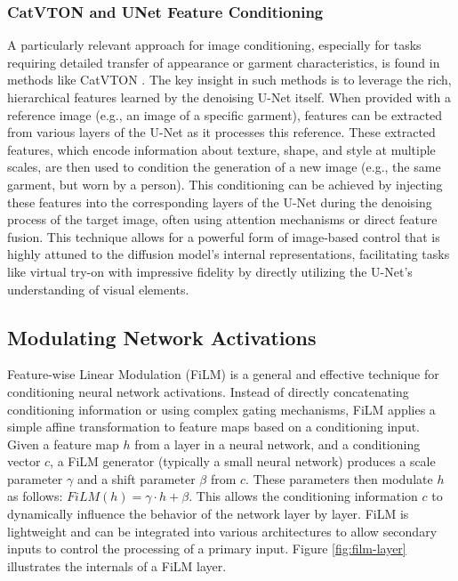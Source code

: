 \subsubsection{CatVTON and UNet Feature Conditioning}
A particularly relevant approach for image conditioning, especially for tasks requiring detailed transfer of appearance or garment characteristics, is found in methods like CatVTON \cite{catvton}. The key insight in such methods is to leverage the rich, hierarchical features learned by the denoising U-Net itself. When provided with a reference image (e.g., an image of a specific garment), features can be extracted from various layers of the U-Net as it processes this reference. These extracted features, which encode information about texture, shape, and style at multiple scales, are then used to condition the generation of a new image (e.g., the same garment, but worn by a person). This conditioning can be achieved by injecting these features into the corresponding layers of the U-Net during the denoising process of the target image, often using attention mechanisms or direct feature fusion. This technique allows for a powerful form of image-based control that is highly attuned to the diffusion model's internal representations, facilitating tasks like virtual try-on with impressive fidelity by directly utilizing the U-Net's understanding of visual elements.

\subsection{Modulating Network Activations}
Feature-wise Linear Modulation (FiLM) \cite{film} is a general and effective technique for conditioning neural network activations. Instead of directly concatenating conditioning information or using complex gating mechanisms, FiLM applies a simple affine transformation to feature maps based on a conditioning input. Given a feature map $h$ from a layer in a neural network, and a conditioning vector $c$, a FiLM generator (typically a small neural network) produces a scale parameter $\gamma$ and a shift parameter $\beta$ from $c$. These parameters then modulate $h$ as follows: $FiLM(h) = \gamma \cdot h + \beta$. This allows the conditioning information $c$ to dynamically influence the behavior of the network layer by layer. FiLM is lightweight and can be integrated into various architectures to allow secondary inputs to control the processing of a primary input. Figure \ref{fig:film-layer} illustrates the internals of a FiLM layer.

